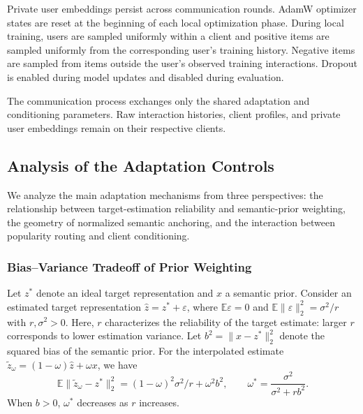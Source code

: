Private user embeddings persist across communication rounds. AdamW optimizer states are reset at the beginning of each local optimization phase. During local training, users are sampled uniformly within a client and positive items are sampled uniformly from the corresponding user's training history. Negative items are sampled from items outside the user's observed training interactions. Dropout is enabled during model updates and disabled during evaluation.

The communication process exchanges only the shared adaptation and conditioning parameters. Raw interaction histories, client profiles, and private user embeddings remain on their respective clients.

\subsection{Analysis of the Adaptation Controls}
\label{sec:theory}

We analyze the main adaptation mechanisms from three perspectives: the relationship between target-estimation reliability and semantic-prior weighting, the geometry of normalized semantic anchoring, and the interaction between popularity routing and client conditioning.

\subsubsection{Bias--Variance Tradeoff of Prior Weighting}

\begin{proposition}
\label{thm:anchor}
Let $z^*$ denote an ideal target representation and $x$ a semantic prior. Consider an estimated target representation $\hat z=z^*+\varepsilon$, where $\mathbb{E}\varepsilon=0$ and $\mathbb{E}\|\varepsilon\|_2^2=\sigma^2/r$ with $r,\sigma^2>0$. Here, $r$ characterizes the reliability of the target estimate: larger $r$ corresponds to lower estimation variance. Let $b^2=\|x-z^*\|_2^2$ denote the squared bias of the semantic prior. For the interpolated estimate $\tilde z_\omega=(1-\omega)\hat z+\omega x$, we have
\begin{equation}
\mathbb{E}\|\tilde z_\omega-z^*\|_2^2
=(1-\omega)^2\sigma^2/r+\omega^2b^2,
\qquad
\omega^*=\frac{\sigma^2}{\sigma^2+rb^2}.
\label{eq:biasvar}
\end{equation}
When $b>0$, $\omega^*$ decreases as $r$ increases.
\end{proposition}

